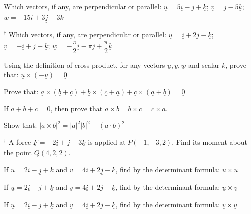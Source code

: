 \documentclass[11pt,a4paper]{article}
\begin{document}
\begin{shortlist}
\item Which vectors, if any, are perpendicular or parallel: $\underline{u}=5\underline{i}-\underline{j}+\underline{k}$; $\underline{v}=\underline{j}-5\underline{k}$; $\underline{w}=-15\underline{i}+3\underline{j}-3\underline{k}$

\item $^{\dagger}$ Which vectors, if any, are perpendicular or parallel: $\underline{u}=\underline{i}+2\underline{j}-\underline{k}$; $\underline{v}=-\underline{i}+\underline{j}+\underline{k}$; $\underline{w}=-\dfrac{\pi}{2}\underline{i}-\pi\underline{j}+\dfrac{\pi}{2}\underline{k}$

\item Using the definition of cross product, for any vectors $\underline{u},\underline{v},\underline{w}$ and scalar $k$, prove that: $\underline{u}\times(-\underline{u})=\underline{0}$

\item Prove that: $\underline{a}\times(\underline{b}+\underline{c})+\underline{b}\times(\underline{c}+\underline{a})+\underline{c}\times(\underline{a}+\underline{b})=\underline{0}$

\item If $\underline{a}+\underline{b}+\underline{c}=\underline{0}$, then prove that $\underline{a}\times\underline{b}=\underline{b}\times\underline{c}=\underline{c}\times\underline{a}$.

\item Show that: $|\underline{a}\times\underline{b}|^2 = |\underline{a}|^2|\underline{b}|^2-(\underline{a}\cdot\underline{b})^2$

\item $^{\dagger}$ A force $\underline{F}=-2\underline{i}+\underline{j}-3\underline{k}$ is applied at $P(-1,-3,2)$. Find its moment about the point $Q(4,2,2)$.

\item If $\underline{u}=2\underline{i}-\underline{j}+\underline{k}$ and $\underline{v}=4\underline{i}+2\underline{j}-\underline{k}$, find by the determinant formula: $\underline{u}\times\underline{u}$

\item If $\underline{u}=2\underline{i}-\underline{j}+\underline{k}$ and $\underline{v}=4\underline{i}+2\underline{j}-\underline{k}$, find by the determinant formula: $\underline{u}\times\underline{v}$

\item If $\underline{u}=2\underline{i}-\underline{j}+\underline{k}$ and $\underline{v}=4\underline{i}+2\underline{j}-\underline{k}$, find by the determinant formula: $\underline{v}\times\underline{u}$


\end{shortlist}
\end{document}
